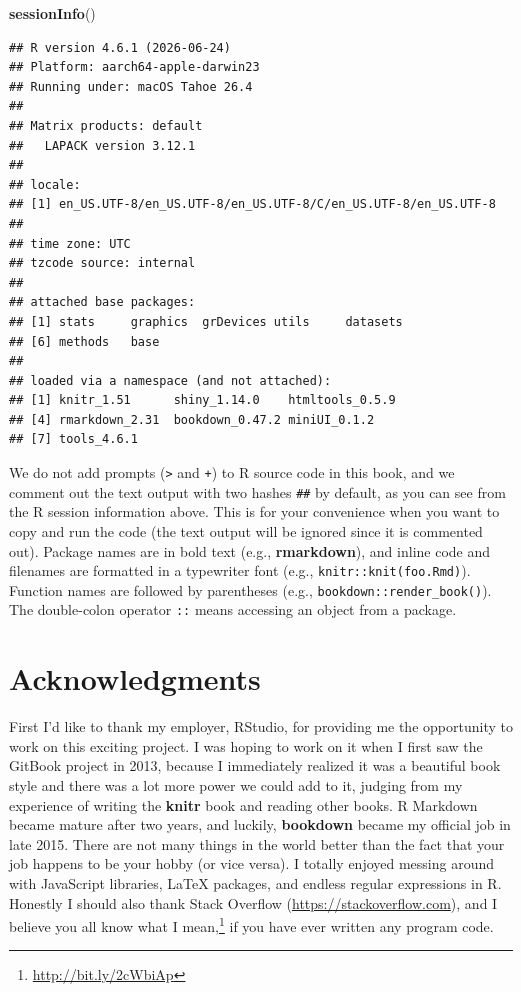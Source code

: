 \documentclass[
  12pt,
]{krantz}
\newenvironment{Shaded}{\begin{snugshade}}{\end{snugshade}}
\newcommand{\FunctionTok}[1]{\textcolor[rgb]{0.13,0.29,0.53}{\textbf{#1}}}
\newcommand{\NormalTok}[1]{#1}
\renewcommand{\href}[2]{#2\footnote{\url{#1}}}
\theoremstyle{definition}
\theoremstyle{definition}
\theoremstyle{definition}
\theoremstyle{definition}
\theoremstyle{remark}
\begin{document}
\begin{Shaded}
\begin{Highlighting}[]
\FunctionTok{sessionInfo}\NormalTok{()}
\end{Highlighting}
\end{Shaded}

\begin{verbatim}
## R version 4.6.1 (2026-06-24)
## Platform: aarch64-apple-darwin23
## Running under: macOS Tahoe 26.4
## 
## Matrix products: default
##   LAPACK version 3.12.1
## 
## locale:
## [1] en_US.UTF-8/en_US.UTF-8/en_US.UTF-8/C/en_US.UTF-8/en_US.UTF-8
## 
## time zone: UTC
## tzcode source: internal
## 
## attached base packages:
## [1] stats     graphics  grDevices utils     datasets 
## [6] methods   base     
## 
## loaded via a namespace (and not attached):
## [1] knitr_1.51      shiny_1.14.0    htmltools_0.5.9
## [4] rmarkdown_2.31  bookdown_0.47.2 miniUI_0.1.2   
## [7] tools_4.6.1
\end{verbatim}

We do not add prompts (\texttt{\textgreater{}} and \texttt{+}) to R source code in this book, and we comment out the text output with two hashes \texttt{\#\#} by default, as you can see from the R session information above. This is for your convenience when you want to copy and run the code (the text output will be ignored since it is commented out). Package names are in bold text (e.g., \textbf{rmarkdown}), and inline code and filenames are formatted in a typewriter font (e.g., \texttt{knitr::knit(\textquotesingle{}foo.Rmd\textquotesingle{})}). Function names are followed by parentheses (e.g., \texttt{bookdown::render\_book()}). The double-colon operator \texttt{::} means accessing an object from a package.

\section*{Acknowledgments}\label{acknowledgments}


First I'd like to thank my employer, RStudio, for providing me the opportunity to work on this exciting project. I was hoping to work on it when I first saw the GitBook project in 2013, because I immediately realized it was a beautiful book style and there was a lot more power we could add to it, judging from my experience of writing the \textbf{knitr} book \citep{xie2015} and reading other books. R Markdown became mature after two years, and luckily, \textbf{bookdown} became my official job in late 2015. There are not many things in the world better than the fact that your job happens to be your hobby (or vice versa). I totally enjoyed messing around with JavaScript libraries, LaTeX packages, and endless regular expressions in R. Honestly I should also thank Stack Overflow (\url{https://stackoverflow.com}), and I believe you all know \href{http://bit.ly/2cWbiAp}{what I mean,} if you have ever written any program code.
\end{document}
